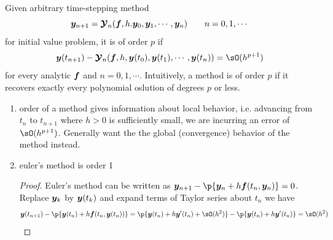 \documentclass[11pt]{article}
\begin{document}
\begin{definition*}
     Given arbitrary time-stepping method 
    \[
        \by_{n+1} = \bsY_n (\bf, h. \by_0, \by_1, \cdots, \by_n) \quad \quad n = 0,1,\cdots   
    \]
    for initial value problem, it is of order $p$ if 
    \[
        \by(t_{n+1}) - \bsY_n (\bf, h, \by(t_0), \by(t_1), \cdots, \by(t_n)) = \sO(h^{p+1})
    \]
    for every analytic $\bf$ and $n=0,1,\cdots$. Intuitively, a method is of order $p$ if it recovers exactly every polynomial oslution of degrees $p$ or less.
    \begin{enumerate}
        \item {} order of a method gives information about local behavior, i.e. advancing from $t_n$ to $t_{n+1}$ where $h>0$ is sufficiently small, we are incurring an error of $\sO(h^{p+1})$. Generally want the the global (convergence) behavior of the method instead.
        \item {} euler's method is order 1
        \begin{proof}
            Euler's method can be written as $\by_{n+1} - \p{\by_n + h\bf(t_n, \by_n)} = 0$. Replace $\by_k$ by $\by(t_k)$ and expand terms of Taylor series about $t_n$ we have 
            \[
                \by(t_{n+1}) - \p{\by(t_n) + h\bf(t_n, \by(t_n))}
                 = \p{
                     \by(t_n) + h\by'(t_n) + \sO(h^2)
                 } - \p{
                     \by(t_n) + h\by'(t_n)
                 } = \sO(h^2)
            \]
        \end{proof}
    \end{enumerate}
\end{definition*}



\subsection{}
\end{document}
